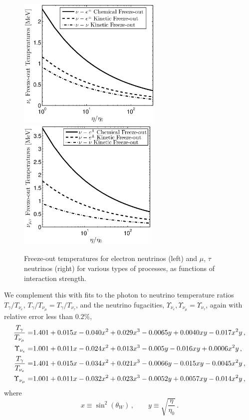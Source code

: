 \begin{figure}
\centerline{\includegraphics[height=6.3cm]{04-birrell/ParametricStudies/Figures/nu_e_freezeout_GF.eps}\hspace{5mm}\includegraphics[height=6.3cm]{04-birrell/ParametricStudies/Figures/nu_mu_freezeout_GF.eps}}
\caption{Freeze-out temperatures for electron neutrinos (left) and $\mu$, $\tau$ neutrinos (right) for various types of processes, as functions of interaction strength. }
\label{fig:freezeoutT_eta}
 \end{figure}



We complement this with fits to the photon to neutrino temperature ratios $ T_\gamma / T_{\nu_e}$, $T_\gamma / T_{\nu_\mu}= T_\gamma / T_{\nu_\tau} $, and the neutrino fugacities, $\Upsilon_{\nu_e}, \Upsilon_{\nu_\mu}=\Upsilon_{\nu_\tau}$, again with relative error less than $0.2\%$,  
\begin{align}
\frac{T_\gamma}{T_{\nu_\mu}}=&1.401+0.015x-0.040x^2+0.029x^3-0.0065y+0.0040xy-0.017x^2y\,, \notag\\
\Upsilon_{\nu_e}=&1.001+0.011x-0.024x^2+0.013x^3-0.005y-0.016xy+0.0006x^2y\,,\notag\\ 
\frac{T_\gamma}{T_{\nu_e}}=&1.401+0.015x-0.034x^2+0.021x^3-0.0066y-0.015xy-0.0045x^2y\,,\notag\\
\Upsilon_{\nu_\mu}=&1.001+0.011x-0.032x^2+0.023x^3-0.0052y+0.0057xy-0.014x^2y\,,
\end{align}
where
\begin{equation}%
x\equiv \sin^2(\theta_W)\, ,\qquad
y\equiv  \sqrt{\frac{\eta}{\eta_0}}\,.
\end{equation}%

